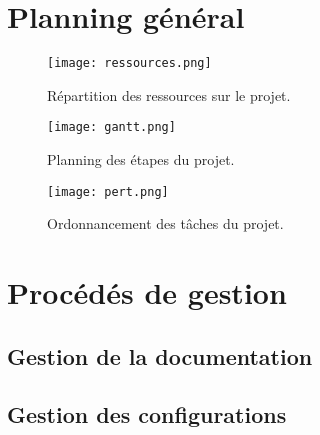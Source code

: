 \documentclass{../../res/univ-projet}
\begin{document}
\newpage
\section{Planning général}

\begin{figure}[h]
\texttt{[image: ressources.png]}
\caption{Répartition des ressources sur le projet.}
\end{figure}
\begin{figure}[h]
\texttt{[image: gantt.png]}
\caption{Planning des étapes du projet.}
\end{figure}

\begin{figure}[h]
\texttt{[image: pert.png]}
\caption{Ordonnancement des tâches du projet.}
\end{figure}


\newpage


\section{Procédés de gestion}
\subsection{Gestion de la documentation}

\subsection{Gestion des configurations}

\end{document}
